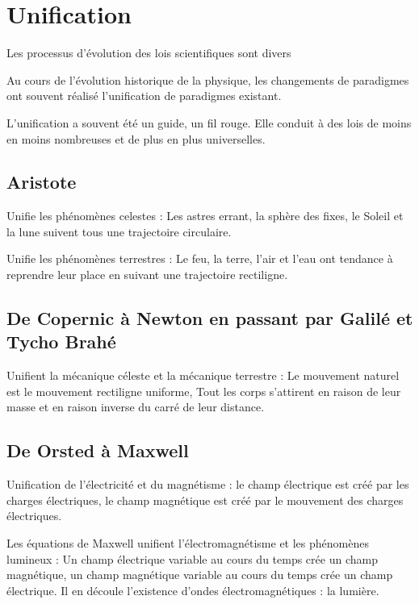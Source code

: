 
\section{Unification}

Les processus d'évolution des lois scientifiques sont divers

Au cours de l'évolution historique de la physique, les changements de paradigmes ont
 souvent
 réalisé l'unification de paradigmes existant.


L'unification a souvent été un guide, un fil rouge. Elle conduit à des lois de moins en moins nombreuses et de plus en plus universelles.

  \subsection{Aristote}

Unifie les phénomènes celestes : Les astres errant, la sphère des fixes, le Soleil et la lune suivent tous une trajectoire circulaire.

Unifie les phénomènes terrestres : Le feu, la terre, l'air et l'eau ont tendance à reprendre leur place en suivant une trajectoire rectiligne.

  \subsection{De Copernic à Newton en passant par Galilé et Tycho Brahé}

Unifient la mécanique céleste et la mécanique terrestre : Le mouvement naturel est le mouvement rectiligne uniforme, Tout les corps s'attirent en raison de leur masse et en raison inverse du carré de leur distance.

  \subsection{De Orsted à Maxwell}

Unification de l'électricité et du magnétisme : le champ électrique est créé par les charges électriques, le champ magnétique est créé par le mouvement des charges électriques.

Les équations de Maxwell unifient l'électromagnétisme et les phénomènes lumineux : Un champ électrique variable au cours du temps crée un champ magnétique, un champ magnétique variable au cours du temps crée un champ électrique. Il en découle l'existence d'ondes électromagnétiques : la lumière.

